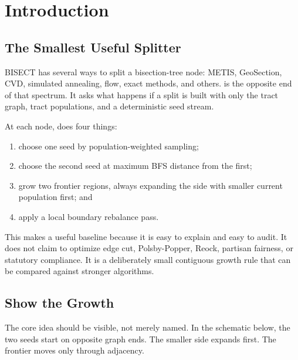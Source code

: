 \section{Introduction}
\label{sec:introduction}

\subsection{The Smallest Useful Splitter}

BISECT has several ways to split a bisection-tree node: METIS, GeoSection,
CVD, simulated annealing, flow, exact methods, and others. \bfsg{} is the
opposite end of that spectrum. It asks what happens if a split is built with
only the tract graph, tract populations, and a deterministic seed stream.

At each node, \bfsg{} does four things:
\begin{enumerate}
\item choose one seed by population-weighted sampling;
\item choose the second seed at maximum BFS distance from the first;
\item grow two frontier regions, always expanding the side with smaller
  current population first; and
\item apply a local boundary rebalance pass.
\end{enumerate}

This makes \bfsg{} a useful baseline because it is easy to explain and easy to
audit. It does not claim to optimize edge cut, Polsby-Popper, Reock, partisan
fairness, or statutory compliance. It is a deliberately small contiguous
growth rule that can be compared against stronger algorithms.

\subsection{Show the Growth}

The core idea should be visible, not merely named. In the schematic below, the
two seeds start on opposite graph ends. The smaller side expands first. The
frontier moves only through adjacency.

